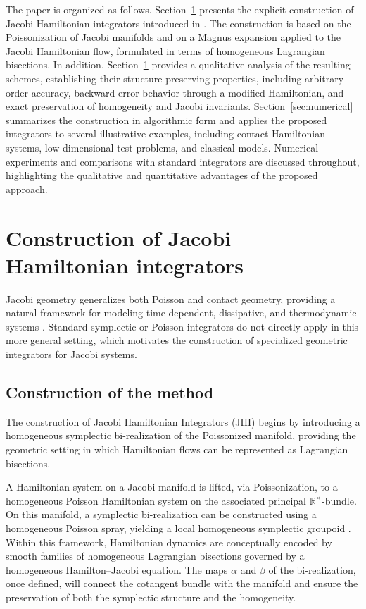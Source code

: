 \documentclass[12pt,english]{article}
\begin{document}
The paper is organized as follows. Section~\ref{sec:construction} presents the explicit construction of Jacobi Hamiltonian integrators introduced in \cite{araujo2025jacobihamiltonianintegrators}. The construction is based on the Poissonization of Jacobi manifolds and on a Magnus expansion applied to the Jacobi Hamiltonian flow, formulated in terms of homogeneous Lagrangian bisections. In addition, Section~\ref{sec:construction} provides a qualitative analysis of the resulting schemes, establishing their structure-preserving properties, including arbitrary-order accuracy, backward error behavior through a modified Hamiltonian, and exact preservation of homogeneity and Jacobi invariants. Section~\ref{sec:numerical} summarizes the construction in algorithmic form and applies the proposed integrators to several illustrative examples, including contact Hamiltonian systems, low-dimensional test problems, and classical models. Numerical experiments and comparisons with standard integrators are discussed throughout, highlighting the qualitative and quantitative advantages of the proposed approach.




\section{Construction of Jacobi Hamiltonian integrators}\label{sec:construction}

Jacobi geometry generalizes both Poisson and contact geometry, providing a natural framework for modeling time-dependent, dissipative, and thermodynamic systems \cite{Bravetti_19, Bravetti_2017,deLeonetal2023,LiuZhang2011,SardondeLucasHerranz2015,ZapataPhD,Zapata2020}. Standard symplectic or Poisson integrators do not directly apply in this more general setting, which motivates the construction of specialized geometric integrators for Jacobi systems.

\subsection{Construction of the method}
The construction of Jacobi Hamiltonian Integrators (JHI) begins by introducing a homogeneous symplectic bi-realization of the Poissonized manifold, providing the geometric setting in which Hamiltonian flows can be represented as Lagrangian bisections.

A Hamiltonian system on a Jacobi manifold is lifted, via Poissonization, to a homogeneous Poisson Hamiltonian system on the associated principal $\mathbb{R}^\times$-bundle. On this manifold, a symplectic bi-realization can be constructed using a homogeneous Poisson spray, yielding a local homogeneous symplectic groupoid \cite{Monica_Blaga_2020,CrainicMarcut2011,CrainicZhu2004}. Within this framework, Hamiltonian dynamics are conceptually encoded by smooth families of homogeneous Lagrangian bisections governed by a homogeneous Hamilton--Jacobi equation. The maps $\alpha$ and $\beta$ of the bi-realization, once defined, will connect the cotangent bundle with the manifold and ensure the preservation of both the symplectic structure and the homogeneity.
\end{document}
